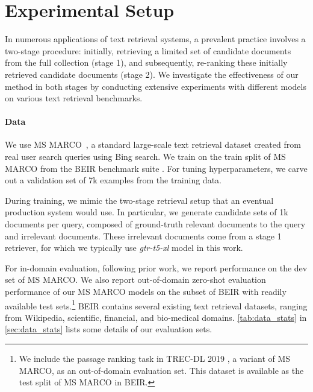 \documentclass{article}
\begin{document}
\section{Experimental Setup} \label{sec:exp-setup}
In numerous applications of text retrieval systems, a prevalent practice involves a two-stage procedure: initially, retrieving a limited set of candidate documents from the full collection (stage 1), and subsequently, re-ranking these initially retrieved candidate documents (stage 2). We investigate the effectiveness of our method in both stages by conducting extensive experiments with different models on various text retrieval benchmarks.



\paragraph{Data} We use MS MARCO~\citep{Campos2016MSMA}, a standard large-scale text retrieval dataset created from real user search queries using Bing search. 
We train on the train split of MS MARCO from the BEIR benchmark suite \citep{Thakur2021BEIRAH}. For tuning hyperparameters, we carve out a validation set of 7k examples from the training data. 

During training, we mimic the two-stage retrieval setup that an eventual production system would use. In particular, we generate candidate sets of 1k documents per query, composed of ground-truth relevant documents to the query and irrelevant documents. These irrelevant documents come from a stage 1 retriever, for which we typically use \textit{gtr-t5-xl} \citep{Ni2021LargeDE} model in this work. 

For in-domain evaluation, following prior work, we report performance on the dev set of MS MARCO. We also report out-of-domain zero-shot evaluation performance of our MS MARCO models on the subset of BEIR with readily available test sets.\footnote{We include the passage ranking task in TREC-DL 2019 \citep{Craswell2020OverviewOT}, a variant of
MS MARCO, as an out-of-domain evaluation set. This dataset is available as the test split of MS MARCO in BEIR.} BEIR contains several existing text retrieval datasets, ranging from Wikipedia, scientific, financial, and bio-medical domains.
\autoref{tab:data_stats} in \autoref{sec:data_stats} lists some details of our evaluation sets. 
\end{document}
